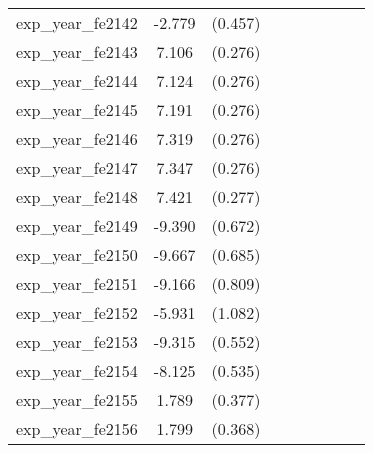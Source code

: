 {\begin{tabular}{l*{4}{cc}}
exp\_year\_fe2142&   -2.779\sym{***}&  (0.457)&                  &         &                  &         &                  &         \\
exp\_year\_fe2143&    7.106\sym{***}&  (0.276)&                  &         &                  &         &                  &         \\
exp\_year\_fe2144&    7.124\sym{***}&  (0.276)&                  &         &                  &         &                  &         \\
exp\_year\_fe2145&    7.191\sym{***}&  (0.276)&                  &         &                  &         &                  &         \\
exp\_year\_fe2146&    7.319\sym{***}&  (0.276)&                  &         &                  &         &                  &         \\
exp\_year\_fe2147&    7.347\sym{***}&  (0.276)&                  &         &                  &         &                  &         \\
exp\_year\_fe2148&    7.421\sym{***}&  (0.277)&                  &         &                  &         &                  &         \\
exp\_year\_fe2149&   -9.390\sym{***}&  (0.672)&                  &         &                  &         &                  &         \\
exp\_year\_fe2150&   -9.667\sym{***}&  (0.685)&                  &         &                  &         &                  &         \\
exp\_year\_fe2151&   -9.166\sym{***}&  (0.809)&                  &         &                  &         &                  &         \\
exp\_year\_fe2152&   -5.931\sym{***}&  (1.082)&                  &         &                  &         &                  &         \\
exp\_year\_fe2153&   -9.315\sym{***}&  (0.552)&                  &         &                  &         &                  &         \\
exp\_year\_fe2154&   -8.125\sym{***}&  (0.535)&                  &         &                  &         &                  &         \\
exp\_year\_fe2155&    1.789\sym{***}&  (0.377)&                  &         &                  &         &                  &         \\
exp\_year\_fe2156&    1.799\sym{***}&  (0.368)&                  &         &                  &         &                  &         \\

\end{tabular}}
